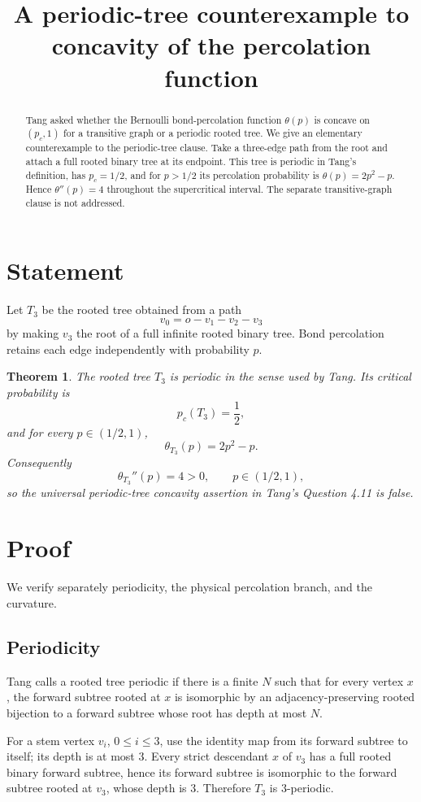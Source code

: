 \documentclass[11pt]{article}
\title{A periodic-tree counterexample to concavity of the percolation function}
\author{}
\date{}
\newtheorem{theorem}{Theorem}
\begin{document}
\maketitle

\begin{abstract}
Tang asked whether the Bernoulli bond-percolation function $\theta(p)$ is concave on $(p_c,1)$ for a transitive graph or a periodic rooted tree. We give an elementary counterexample to the periodic-tree clause. Take a three-edge path from the root and attach a full rooted binary tree at its endpoint. This tree is periodic in Tang's definition, has $p_c=1/2$, and for $p>1/2$ its percolation probability is $\theta(p)=2p^2-p$. Hence $\theta''(p)=4$ throughout the supercritical interval. The separate transitive-graph clause is not addressed.
\end{abstract}

\section{Statement}
Let $T_3$ be the rooted tree obtained from a path
\[
v_0=o-v_1-v_2-v_3
\]
by making $v_3$ the root of a full infinite rooted binary tree. Bond percolation retains each edge independently with probability $p$.

\begin{theorem}
The rooted tree $T_3$ is periodic in the sense used by Tang. Its critical probability is
\[
p_c(T_3)=\frac12,
\]
and for every $p\in(1/2,1)$,
\[
\theta_{T_3}(p)=2p^2-p.
\]
Consequently
\[
\theta_{T_3}''(p)=4>0,
\qquad p\in(1/2,1),
\]
so the universal periodic-tree concavity assertion in Tang's Question 4.11 is false.
\end{theorem}

\section{Proof}
We verify separately periodicity, the physical percolation branch, and the curvature.

\subsection{Periodicity}
Tang calls a rooted tree periodic if there is a finite $N$ such that for every vertex $x$, the forward subtree rooted at $x$ is isomorphic by an adjacency-preserving rooted bijection to a forward subtree whose root has depth at most $N$.

For a stem vertex $v_i$, $0\le i\le3$, use the identity map from its forward subtree to itself; its depth is at most $3$. Every strict descendant $x$ of $v_3$ has a full rooted binary forward subtree, hence its forward subtree is isomorphic to the forward subtree rooted at $v_3$, whose depth is $3$. Therefore $T_3$ is $3$-periodic.
\end{document}
